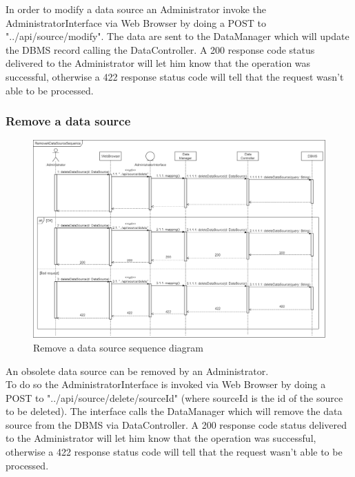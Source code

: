 In order to modify a data source an Administrator invoke the AdministratorInterface via Web Browser by doing a POST to "../api/source/modify". The data are sent to the DataManager which will update the DBMS record calling the DataController.
A 200 response code status delivered to the Administrator will let him know that the operation was successful, otherwise a 422 response status code will tell that the request wasn't able to be processed.

\newpage
\subsubsection{Remove a data source}

\begin{figure}[h!]
        \centering
        \includegraphics[scale=0.27]{images/runtime_view/remove_data_source_runtime_view_diagram.png}
        \caption{Remove a data source sequence diagram}
        \label{fig:remove_data_source_sequence_diagram}
\end{figure}
\FloatBarrier

An obsolete data source can be removed by an Administrator. \\
To do so the AdministratorInterface is invoked via Web Browser by doing a POST to "../api/source/delete/{sourceId}" (where sourceId is the id of the source to be deleted). The interface calls the DataManager which will remove the data source from the DBMS via DataController. 
A 200 response code status delivered to the Administrator will let him know that the operation was successful, otherwise a 422 response status code will tell that the request wasn't able to be processed.


